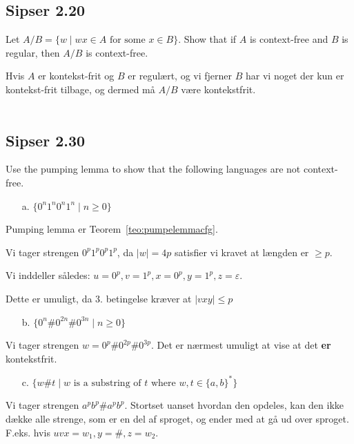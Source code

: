 \noindent
\subsection*{Sipser 2.20}
\noindent
Let $A/B = \{w \; | \; wx \in A \text{ for some }x \in B\}$. Show that if $A$ is context-free and $B$ is regular, then $A/B$ is context-free.

Hvis $A$ er kontekst-frit og $B$ er regulært, og vi fjerner $B$ har vi noget der kun er kontekst-frit tilbage, og dermed må $A/B$ være kontekstfrit.\\\\

\noindent
\subsection*{Sipser 2.30}
\noindent
Use the pumping lemma to show that the following languages are not context-free.

\begin{enumerate}
	\item[a.] $\{0^{n}1^{n}0^{n}1^{n}\;|\; n \ge 0\}$
\end{enumerate}

Pumping lemma er Teorem~\ref{teo:pumpelemmacfg}.

Vi tager strengen $0^{p}1^{p}0^{p}1^{p}$, da $|w| = 4p$ satisfier vi kravet at længden er $\ge p$.

Vi inddeller således: $u= 0^{p}, v = 1^{p}, x = 0^{p}, y = 1^{p}, z = \varepsilon$.

Dette er umuligt, da 3. betingelse kræver at $|vxy| \leq p$

\begin{enumerate}
	\item[b.] $\{0^{n}\# 0^{2n} \# 0^{3n} \; | \; n \ge 0\}$
\end{enumerate}

Vi tager strengen $w = 0^{p}\#0^{2p}\#0^{3p}$. Det er nærmest umuligt at vise at det \textbf{er} kontekstfrit.

\begin{enumerate}
	\item[c.] $\{w\#t \; | \; w \text{ is a substring of }t \text{ where }w,t \in \{a,b\}^{*}\}$
\end{enumerate}

Vi tager strengen $a^{p}b^{p}\#a^{p}b^{p}$. Stortset uanset hvordan den opdeles, kan den ikke dække alle strenge, som er en del af sproget, og ender med at gå ud over sproget. F.eks. hvis $uvx = w_{1}, y = \#, z = w_{2}$.

